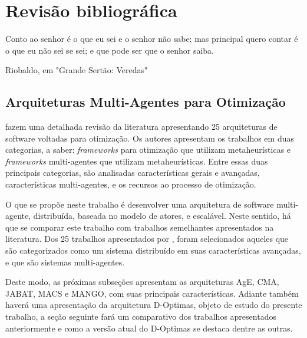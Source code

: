 \chapter{Revisão bibliográfica}
\label{chap:revisao}

\epigraph{Conto ao senhor é o que eu sei e o senhor não sabe; mas principal quero contar é o que eu não sei se sei; e que pode ser que o senhor saiba.}{Riobaldo, em "Grande Sertão: Veredas"}

\section{Arquiteturas Multi-Agentes para Otimização}
 fazem uma detalhada revisão da literatura apresentando 25 arquiteturas de software voltadas para otimização. 
Os autores apresentam os trabalhos em duas categorias, a saber: \textit{frameworks} para otimização que utilizam metaheurísticas e \textit{frameworks} multi-agentes que utilizam metaheurísticas. Entre essas duas principais categorias, são analisadas características gerais e avançadas, características multi-agentes, e os recursos ao processo de otimização. 

O que se propõe neste trabalho é desenvolver uma arquitetura de software multi-agente, distribuída, baseada no modelo de atores, e escalável. Neste sentido, há que se comparar este trabalho com trabalhos semelhantes apresentados na literatura. Dos 25 trabalhos apresentados por , foram selecionados aqueles que são categorizados como um sistema distribuído em suas características avançadas, e que são sistemas multi-agentes.

Deste modo, as próximas subseções apresentam as arquiteturas AgE, CMA, JABAT, MACS e MANGO, com suas principais características. Adiante também haverá uma apresentação da arquitetura D-Optimas, objeto de estudo do presente trabalho, a seção seguinte fará um comparativo dos trabalhos apresentados anteriormente e como a versão atual do D-Optimas se destaca dentre as outras.

